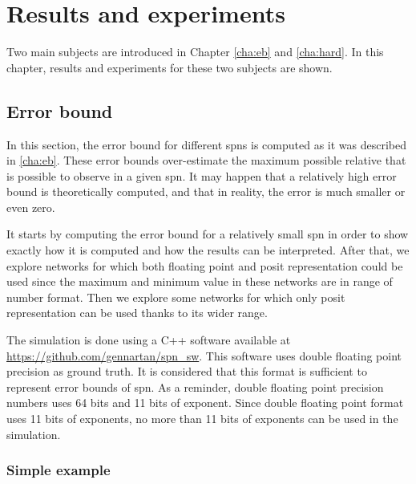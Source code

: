 
\chapter{Results and experiments}
\label{cha:res}

Two main subjects are introduced in Chapter \ref{cha:eb} and \ref{cha:hard}. In this chapter, results and experiments for these two subjects are shown.


\section{Error bound}

In this section, the error bound for different \glspl{spn} is computed as it was described in \ref{cha:eb}. These error bounds over-estimate the maximum possible relative that is possible to observe in a given \gls{spn}. It may happen that a relatively high error bound is theoretically computed, and that in reality, the error is much smaller or even zero.

It starts by computing the error bound for a relatively small \gls{spn} in order to show exactly how it is computed and how the results can be interpreted. After that, we explore networks for which both floating point and posit representation could be used since the maximum and minimum value in these networks are in range of number format. Then we explore some networks for which only posit representation can be used thanks to its wider range.

The simulation is done using a C++ software available at \url{https://github.com/gennartan/spn_sw}. This software uses double floating point precision as ground truth. It is considered that this format is sufficient to represent error bounds of \gls{spn}. As a reminder, double floating point precision numbers uses 64 bits and 11 bits of exponent. Since double floating point format uses 11 bits of exponents, no more than 11 bits of exponents can be used in the simulation.



\subsection{Simple example \label{sec:simple_example}}

